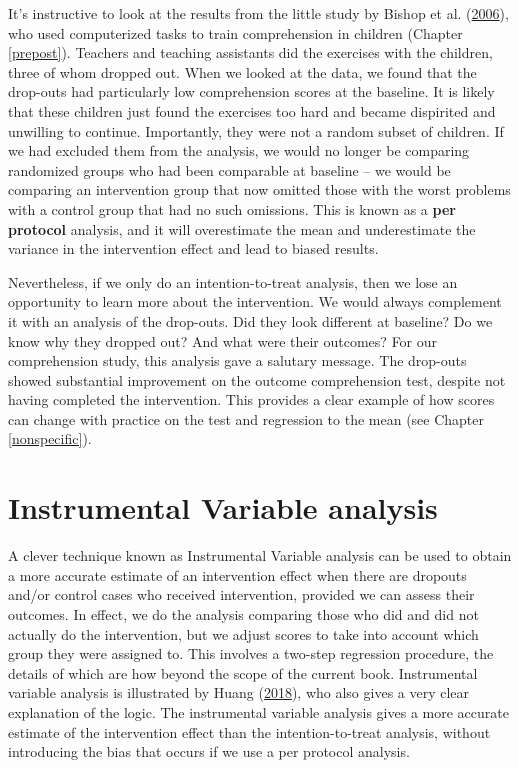 \documentclass{krantz}
\begin{document}
It's instructive to look at the results from the little study by Bishop et al. (\protect\hyperlink{ref-bishop2006}{2006}), who used computerized tasks to train comprehension in children (Chapter \ref{prepost}). Teachers and teaching assistants did the exercises with the children, three of whom dropped out. When we looked at the data, we found that the drop-outs had particularly low comprehension scores at the baseline. It is likely that these children just found the exercises too hard and became dispirited and unwilling to continue. Importantly, they were not a random subset of children. If we had excluded them from the analysis, we would no longer be comparing randomized groups who had been comparable at baseline -- we would be comparing an intervention group that now omitted those with the worst problems with a control group that had no such omissions. This is known as a \textbf{per protocol} analysis, and it will overestimate the mean and underestimate the variance in the intervention effect and lead to biased results.

Nevertheless, if we only do an intention-to-treat analysis, then we lose an opportunity to learn more about the intervention. We would always complement it with an analysis of the drop-outs. Did they look different at baseline? Do we know why they dropped out? And what were their outcomes? For our comprehension study, this analysis gave a salutary message. The drop-outs showed substantial improvement on the outcome comprehension test, despite not having completed the intervention. This provides a clear example of how scores can change with practice on the test and regression to the mean (see Chapter \ref{nonspecific}).

\hypertarget{instrumental-variable-analysis}{%
\section{Instrumental Variable analysis}\label{instrumental-variable-analysis}}

A clever technique known as Instrumental Variable analysis can be used to obtain a more accurate estimate of an intervention effect when there are dropouts and/or control cases who received intervention, provided we can assess their outcomes. In effect, we do the analysis comparing those who did and did not actually do the intervention, but we adjust scores to take into account which group they were assigned to. This involves a two-step regression procedure, the details of which are how beyond the scope of the current book. Instrumental variable analysis is illustrated by Huang (\protect\hyperlink{ref-huang2018}{2018}), who also gives a very clear explanation of the logic. The instrumental variable analysis gives a more accurate estimate of the intervention effect than the intention-to-treat analysis, without introducing the bias that occurs if we use a per protocol analysis.
\end{document}
